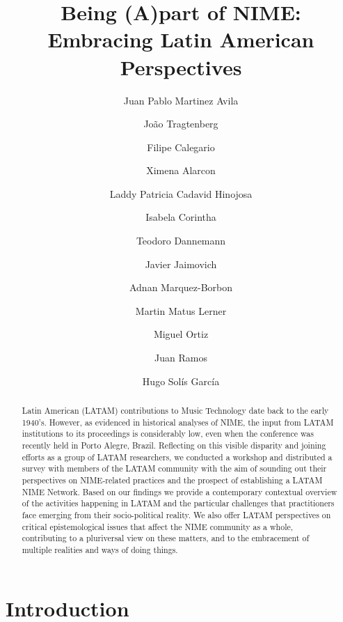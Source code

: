 \documentclass[sigconf]{nimeart}
\begin{document}
\title[Being (A)part of NIME: Embracing Latin American Perspectives]{Being (A)part of NIME: Embracing Latin American Perspectives}
\author{Juan Pablo Martinez Avila}
\affiliation{\institution{}\country{}}
\author{João Tragtenberg}
\affiliation{\institution{}\country{}}
\author{Filipe Calegario}
\affiliation{\institution{}\country{}}
\author{Ximena Alarcon}
\affiliation{\institution{}\country{}}
\author{Laddy Patricia Cadavid Hinojosa}
\affiliation{\institution{}\country{}}
\author{Isabela Corintha}
\affiliation{\institution{}\country{}}
\author{Teodoro Dannemann}
\affiliation{\institution{}\country{}}
\author{Javier Jaimovich}
\affiliation{\institution{}\country{}}
\author{Adnan Marquez-Borbon}
\affiliation{\institution{}\country{}}
\author{Martin Matus Lerner}
\affiliation{\institution{}\country{}}
\author{Miguel Ortiz}
\affiliation{\institution{}\country{}}
\author{Juan Ramos}
\affiliation{\institution{}\country{}}
\author{Hugo Solís García}
\affiliation{\institution{}\country{}}
\renewcommand{\shortauthors}{Avila et al.}
\begin{abstract}
Latin American (LATAM) contributions to Music Technology date back to the early 1940's. However, as evidenced in historical analyses of NIME, the input from LATAM institutions to its proceedings is considerably low, even when the conference was recently held in Porto Alegre, Brazil. Reflecting on this visible disparity and joining efforts as a group of LATAM researchers, we conducted a workshop and distributed a survey with members of the LATAM community with the aim of sounding out their perspectives on NIME-related practices and the prospect of establishing a LATAM NIME Network. Based on our findings we provide a contemporary contextual overview of the activities happening in LATAM and the particular challenges that practitioners face emerging from their socio-political reality. We also offer LATAM perspectives on critical epistemological issues that affect the NIME community as a whole, contributing to a pluriversal view on these matters, and to the embracement of multiple realities and ways of doing things.
\end{abstract}

\maketitle
\section{Introduction}\label{introduction}
\end{document}
